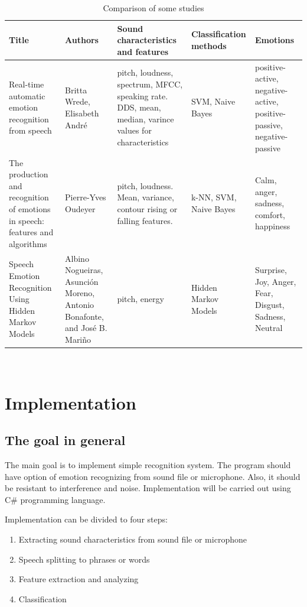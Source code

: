 \documentclass[12pt, letterpaper]{article}
\begin{document}
\begin{table}[h]
	\begin{tabular}{|p{3cm}|p{3cm}|p{3cm}|p{3cm}|p{3cm}|}
		Title & Authors & Sound characteristics and features & Classification methods & Emotions \\ \hline
		Real-time automatic emotion recognition
		from speech & Britta Wrede, Elisabeth André & pitch, loudness, spectrum, MFCC, speaking rate. DDS, mean, median, varince values for characteristics & SVM, Naive Bayes & positive-active, negative-active, positive-passive, negative-passive\\ \hline
		The production and recognition of emotions in
		speech: features and algorithms & Pierre-Yves Oudeyer & pitch, loudness. Mean, variance, contour rising or falling features. & k-NN, SVM, Naive Bayes& Calm, anger, sadness, comfort, happiness\\ \hline
		Speech Emotion Recognition Using Hidden Markov Models & Albino Nogueiras, Asunción Moreno, Antonio Bonafonte, and José B. Mariño & pitch, energy & Hidden Markov Models & Surprise, Joy, Anger, Fear, Disgust, Sadness, Neutral \\\hline
	\end{tabular}
	\caption{Comparison of some studies}
	\
\end{table}
\section{Implementation}
\subsection{The goal in general}
The main goal is to implement simple recognition system. The program should have option of emotion recognizing from sound file or microphone. Also, it should be resistant to interference and noise. Implementation will be carried out using C\# programming language.

Implementation can be divided to four steps:
\begin{enumerate}
	\item Extracting sound characteristics from sound file or microphone
	\item Speech splitting to phrases or words
	\item Feature extraction and analyzing
	\item Classification
\end{enumerate}
\end{document}

